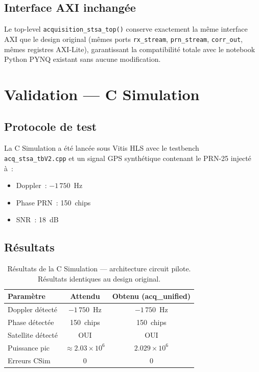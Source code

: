 \documentclass[11pt,a4paper]{article}
\begin{document}
\subsection{Interface AXI inchangée}

Le top-level \texttt{acquisition\_stsa\_top()} conserve exactement la même interface AXI que le design original (mêmes ports \texttt{rx\_stream}, \texttt{prn\_stream}, \texttt{corr\_out}, mêmes registres AXI-Lite), garantissant la compatibilité totale avec le notebook Python PYNQ existant sans aucune modification.

\section{Validation --- C Simulation}
\label{sec:validation-prn25}

\subsection{Protocole de test}

La C Simulation a été lancée sous Vitis HLS avec le testbench \texttt{acq\_stsa\_tbV2.cpp} et un signal GPS synthétique contenant le PRN-25 injecté à~:
\begin{itemize}
  \item Doppler~: $-1\,750$~Hz
  \item Phase PRN~: 150~chips
  \item SNR~: 18~dB
\end{itemize}

\subsection{Résultats}

\begin{table}[H]
\centering
\renewcommand{\arraystretch}{1.3}
\begin{tabular}{lcc}
\toprule
\textbf{Paramètre} & \textbf{Attendu} & \textbf{Obtenu (acq\_unified)} \\
\midrule
Doppler détecté & $-1\,750$~Hz & $-1\,750$~Hz \\
Phase détectée  & 150~chips & 150~chips \\
Satellite détecté & OUI & OUI \\
Puissance pic   & $\approx 2.03 \times 10^6$ & $2.029 \times 10^6$ \\
Erreurs CSim    & 0 & 0 \\
\bottomrule
\end{tabular}
\caption{Résultats de la C Simulation --- architecture circuit pilote. Résultats identiques au design original.}
\end{table}
\end{document}
